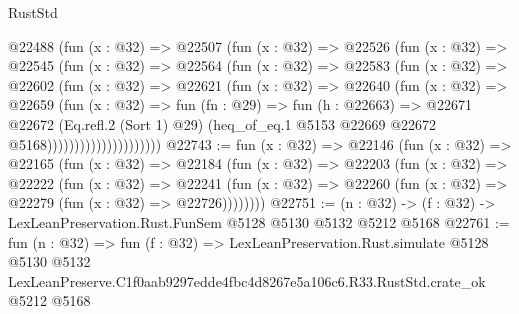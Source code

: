 \begin{lexlean}{RustStd}
\begin{coremodule}
                      @22488
                        (fun (x : @32) =>
                        @22507
                          (fun (x : @32) =>
                          @22526
                            (fun (x : @32) =>
                            @22545
                              (fun (x : @32) =>
                              @22564
                                (fun (x : @32) =>
                                @22583
                                  (fun (x : @32) =>
                                  @22602
                                    (fun (x : @32) =>
                                    @22621
                                      (fun (x : @32) =>
                                      @22640
                                        (fun (x : @32) =>
                                        @22659
                                          (fun (x : @32) =>
                                          fun (fn : @29) =>
                                          fun (h : @22663) =>
                                          @22671
                                            @22672
                                            (Eq.refl.{2} (Sort 1) @29)
                                            (heq_of_eq.{1}
                                              @5153
                                              @22669
                                              @22672
                                              @5168)))))))))))))))))))))
@22743 := fun (x : @32) =>
  @22146
    (fun (x : @32) =>
    @22165
      (fun (x : @32) =>
      @22184
        (fun (x : @32) =>
        @22203
          (fun (x : @32) =>
          @22222
            (fun (x : @32) =>
            @22241
              (fun (x : @32) => @22260 (fun (x : @32) => @22279 (fun (x : @32) => @22726))))))))
@22751 := (n : @32) -> (f : @32) -> LexLeanPreservation.Rust.FunSem @5128 @5130 @5132 @5212 @5168
@22761 := fun (n : @32) =>
  fun (f : @32) =>
  LexLeanPreservation.Rust.simulate
    @5128
    @5130
    @5132
    LexLeanPreserve.C1f0aab9297edde4fbc4d8267e5a106c6.R33.RustStd.crate_ok
    @5212
    @5168
\end{coremodule}
\end{lexlean}
